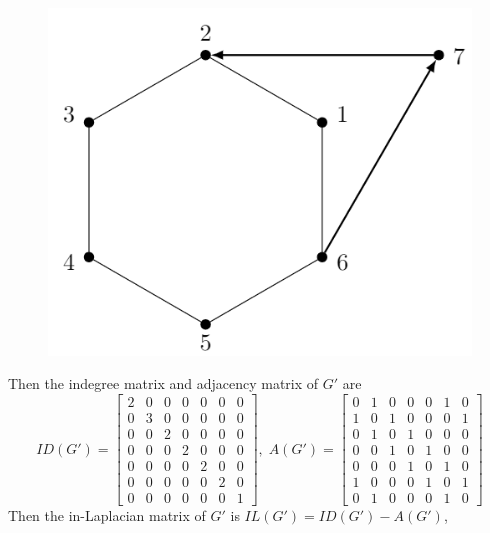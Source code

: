 \documentclass[twoside,11pt]{article}
\numberwithin{equation}{section} \DeclareMathOperator{\Var}{Var}
\begin{document}
\begin{figure}[H]
  \centering
  \includegraphics[scale=0.5]{tik_example.PNG}  
\end{figure}

Then the indegree matrix and adjacency matrix of $G'$ are \[ ID(G')=
\begin{bmatrix}
2 & 0 & 0 & 0 & 0 & 0 & 0\\
0 & 3 & 0 & 0 & 0 & 0 & 0\\
0 & 0 & 2 & 0 & 0 & 0 & 0\\
0 & 0 & 0 & 2 & 0 & 0 & 0\\
0 & 0 & 0 & 0 & 2 & 0 & 0\\
0 & 0 & 0 & 0 & 0 & 2 & 0\\
0 & 0 & 0 & 0 & 0 & 0 & 1
\end{bmatrix},\; A(G')=
\begin{bmatrix}
0 & 1 & 0 & 0 & 0 & 1 & 0\\
1 & 0 & 1 & 0 & 0 & 0 & 1\\
0 & 1 & 0 & 1 & 0 & 0 & 0\\
0 & 0 & 1 & 0 & 1 & 0 & 0\\
0 & 0 & 0 & 1 & 0 & 1 & 0\\
1 & 0 & 0 & 0 & 1 & 0 & 1\\
0 & 1 & 0 & 0 & 0 & 1 & 0
\end{bmatrix}
\]
Then the in-Laplacian matrix of $G'$ is $IL(G')=ID(G')-A(G')$, 
\end{document}
